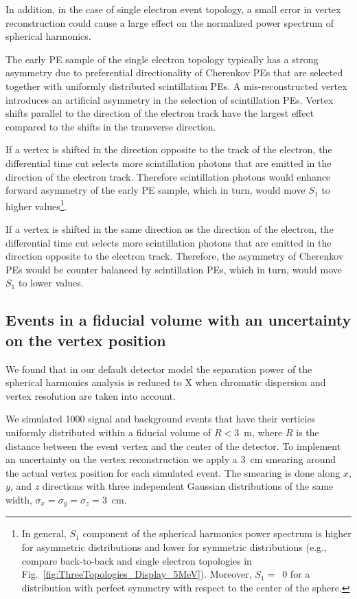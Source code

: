 In addition, in the case of single electron event topology, a small error in vertex reconstruction could cause a large effect on the 
normalized power spectrum of spherical harmonics.

The early PE sample of the single electron topology typically has a strong asymmetry due
to preferential directionality of Cherenkov PEs that are selected together with uniformly distributed scintillation PEs. 
A mis-reconstructed vertex introduces an artificial asymmetry in the selection of scintillation PEs. Vertex shifts parallel to the direction of 
the electron track have the largest effect compared to the shifts in the transverse direction. 

If a vertex is shifted in the direction opposite to the track of the electron, the differential time cut selects more scintillation 
photons that are emitted in the direction of the electron track. Therefore scintillation photons would enhance forward asymmetry of the early PE
sample, which in turn, would move $S_1$ to higher values\footnote{In general, $S_1$ component of the
spherical harmonics power spectrum is higher for asymmetric distributions and lower for symmetric distributions (e.g., compare back-to-back
and single electron topologies in Fig.~\ref{fig:ThreeTopologies_Display_5MeV}). Moreover, $S_1=$~0 for a distribution with perfect symmetry
with respect to the center of the sphere.}.

If a vertex is shifted in the same direction as the direction of the electron, the differential time cut selects more scintillation
photons that are emitted in the direction opposite to the electron track. Therefore, the asymmetry of Cherenkov PEs would be counter
balanced by scintillation PEs, which in turn, would move $S_1$ to lower values.


\subsection{Events in a fiducial volume with an uncertainty on the vertex position}
We found that in our default detector model the separation power of the spherical harmonics analysis is reduced to X when
chromatic dispersion and vertex resolution are taken into account.

We simulated 1000 signal and background events that have their verticies uniformly distributed within a fiducial volume of $R<3$~m, 
where $R$ is the distance between the event vertex and the center of the detector. To implement an uncertainty on the vertex 
reconstruction we apply a 3~cm smearing around the actual vertex position for each simulated event. The smearing is done along $x$, $y$, 
and $z$ directions with three independent Gaussian distributions of the same width, $\sigma_x = \sigma_y = \sigma_z =$3~cm.


